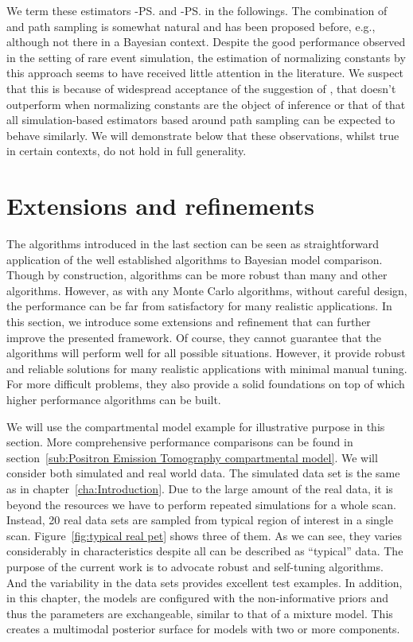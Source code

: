 We term these estimators \smc[2]-\ps and \smc[3]-\ps in the followings. The
combination of \smc and path sampling is somewhat natural and has been
proposed before, e.g., \cite{Johansen:2006wm} although not there in a Bayesian
context. Despite the good performance observed in the setting of rare
event simulation, the estimation of normalizing constants by this approach
seems to have received little attention in the literature. We suspect that
this is because of widespread acceptance of the suggestion of
\cite{DelMoral:2006hc}, that \smc doesn't outperform \ais when normalizing
constants are the object of inference or that of \cite{Calderhead:2009bd}
that all simulation-based estimators based around path sampling can be
expected to behave similarly. We will demonstrate below that these
observations, whilst true in certain contexts, do not hold in full generality.

\section{Extensions and refinements}
\label{sec:Extensions and refinements}

The algorithms introduced in the last section can be seen as straightforward
application of the well established \smc algorithms to Bayesian model
comparison. Though by construction, \smc algorithms can be more robust than
many \mcmc and other algorithms. However, as with any Monte Carlo algorithms,
without careful design, the performance can be far from satisfactory for many
realistic applications. In this section, we introduce some extensions and
refinement that can further improve the presented framework. Of course, they
cannot guarantee that the algorithms will perform well for all possible
situations. However, it provide robust and reliable solutions for many
realistic applications with minimal manual tuning. For more difficult
problems, they also provide a solid foundations on top of which higher
performance algorithms can be built.

We will use the \pet compartmental model example for illustrative purpose in
this section. More comprehensive performance comparisons can be found in
section~\ref{sub:Positron Emission Tomography compartmental model}. We will
consider both simulated and real world data. The simulated data set is the
same as in chapter~\ref{cha:Introduction}. Due to the large amount of the real
data, it is beyond the resources we have to perform repeated simulations for a
whole \pet scan. Instead, 20 real data sets are sampled from typical region of
interest in a single \pet scan. Figure~\ref{fig:typical real pet} shows three
of them. As we can see, they varies considerably in characteristics despite
all can be described as ``typical'' \pet data. The purpose of the current work
is to advocate robust and self-tuning algorithms. And the variability in the
data sets provides excellent test examples. In addition, in this chapter, the
models are configured with the non-informative priors and thus the parameters
are exchangeable, similar to that of a mixture model. This creates a
multimodal posterior surface for models with two or more components.

